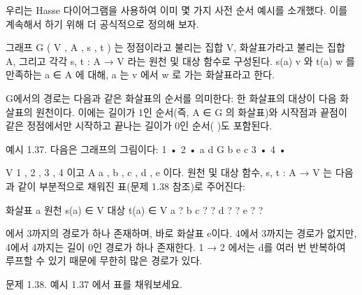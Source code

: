 \documentclass[11pt, a4paper, twoside, openany]{book}
\begin{document}
\par\medskip
우리는 Hasse 다이어그램을 사용하여 이미 몇 가지 사전 순서 예시를 소개했다. 이를 계속해서 하기 위해 더 공식적으로 정의해 보자.

\par\medskip
\begin{definitionbox}[정의 1.36.]
그래프 G  ( V , A , s , t ) 는 정점이라고 불리는 집합 V, 화살표가라고 불리는 집합 A, 그리고 각각 s, t : A → V 라는 원천 및 대상 함수로 구성된다.  s(a)  v 와 t(a)  w 를 만족하는 a ∈ A 에 대해, a 는 v 에서 w 로 가는 화살표라고 한다.
\end{definitionbox}

\par\medskip
G\hspace{0pt}에서의 경로는 다음과 같은 화살표의 순서를 의미한다: 한 화살표의 대상이 다음 화살표의 원천이다. 이에는 길이가 1\hspace{0pt}인 순서(즉, A ∈ G 의 화살표)와 시작점과 끝점이 같은 정점에서만 시작하고 끝나는 길이가 0\hspace{0pt}인 순서( )도 포함된다.

\par\medskip
예시 1.37. 다음은 그래프의 그림이다:
1 •
2 •
a
d
G 
b
e
c
3 •
4 •

\par\medskip
V  { 1 , 2 , 3 , 4 } 이고 A  { a , b , c , d , e } 이다. 원천 및 대상 함수, s, t : A → V 는 다음과 같이 부분적으로 채워진 표(문제 1.38 참조)로 주어진다:

\par\medskip
화살표 a
원천 s(a) ∈ V
대상 t(a) ∈ V
a
?
b
c
?
?
d
?
?
e
?
?

\par{}\hspace{0pt}에서 3\hspace{0pt}까지의 경로가 하나 존재하며, 바로 화살표 e\hspace{0pt}이다. 4\hspace{0pt}에서 3\hspace{0pt}까지는 경로가 없지만, 4\hspace{0pt}에서 4\hspace{0pt}까지는 길이 0\hspace{0pt}인 경로가 하나 존재한다. 1 → 2 에서는 d\hspace{0pt}를 여러 번 반복하여 루프할 수 있기 때문에 무한히 많은 경로가 있다.

\par\medskip
문제 1.38.
예시 1.37 에서 표를 채워보세요.
\end{document}

